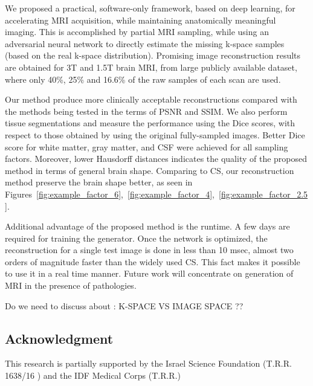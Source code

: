 \documentclass[review]{elsarticle}
\begin{document}
We proposed a practical, software-only framework, based on deep learning, for accelerating MRI acquisition, while maintaining anatomically meaningful imaging. This is accomplished by partial MRI sampling, while using an adversarial neural network to directly estimate the missing k-space samples (based on the real k-space distribution). Promising image reconstruction results are obtained for 3T and 1.5T brain MRI, from large publicly available dataset, where only 40\%, 25\% and 16.6\% of the raw samples of each scan are used.

Our method produce more clinically acceptable reconstructions compared with the methods being tested in the terms of PSNR and SSIM. We also perform tissue segmentations and measure the performance using the Dice scores, with respect to those obtained by using the original fully-sampled images. Better Dice score for white matter, gray matter, and CSF were achieved for all sampling factors. Moreover, lower Hausdorff distances indicates the quality of the proposed method in terms of general brain shape. Comparing to CS, our reconstruction method preserve the brain shape better, as seen in Figures~\ref{fig:example_factor_6},~\ref{fig:example_factor_4},~\ref{fig:example_factor_2.5}.

Additional advantage of the proposed method is the runtime. A few days are required for training the generator. Once the network is optimized, the reconstruction for a single test image is done in less than 10 msec, almost two orders of magnitude faster than the widely used CS. This fact makes it possible to use it in a real time manner.
Future work will concentrate on generation of MRI in the presence of pathologies.

{\color{red}
Do we need to discuss about :
K-SPACE VS IMAGE SPACE ??
}

\subsection{Acknowledgment}
This research is partially supported by the Israel Science Foundation (T.R.R. 1638/16 ) and the IDF Medical Corps (T.R.R.)
\end{document}
